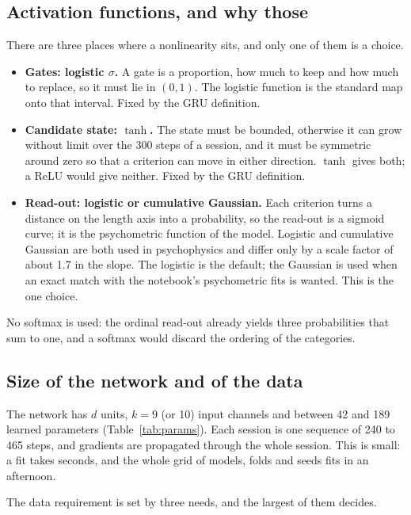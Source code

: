 \documentclass[11pt,a4paper]{article}
\begin{document}
\subsection{Activation functions, and why those}

There are three places where a nonlinearity sits, and only one of them is a choice.

\begin{itemize}[leftmargin=*]
\item \textbf{Gates: logistic $\sigma$.} A gate is a proportion, how much to keep and
      how much to replace, so it must lie in $(0,1)$. The logistic function is the
      standard map onto that interval. Fixed by the GRU definition.
\item \textbf{Candidate state: $\tanh$.} The state must be bounded, otherwise it can
      grow without limit over the 300 steps of a session, and it must be symmetric
      around zero so that a criterion can move in either direction. $\tanh$ gives both;
      a ReLU would give neither. Fixed by the GRU definition.
\item \textbf{Read-out: logistic or cumulative Gaussian.} Each criterion turns a
      distance on the length axis into a probability, so the read-out is a sigmoid
      curve; it is the psychometric function of the model. Logistic and cumulative
      Gaussian are both used in psychophysics and differ only by a scale factor of about
      1.7 in the slope. The logistic is the default; the Gaussian is used when an exact
      match with the notebook's psychometric fits is wanted. This is the one choice.
\end{itemize}

No softmax is used: the ordinal read-out already yields three probabilities that sum to
one, and a softmax would discard the ordering of the categories.

\subsection{Size of the network and of the data}

The network has $d$ units, $k = 9$ (or 10) input channels and between 42 and 189
learned parameters (Table~\ref{tab:params}). Each session is one sequence of 240 to 465
steps, and gradients are propagated through the whole session. This is small: a fit
takes seconds, and the whole grid of models, folds and seeds fits in an afternoon.

The data requirement is set by three needs, and the largest of them decides.
\end{document}
